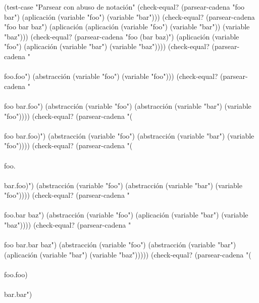 \documentclass[10pt,oneside,openany,letterpaper]{book}
\begin{document}
\nwenddocs{}\plusendmoddef
(test-case "Parsear con abuso de notación"
  (check-equal? (parsear-cadena "foo bar")
                (aplicación (variable "foo") (variable "bar")))
  (check-equal? (parsear-cadena "foo bar baz")
                (aplicación (aplicación (variable "foo") (variable "bar"))
                            (variable "baz")))
  (check-equal? (parsear-cadena "foo (bar baz)")
                (aplicación (variable "foo")
                            (aplicación (variable "bar") (variable "baz"))))
  (check-equal? (parsear-cadena "\\\\foo.foo")
                (abstracción (variable "foo") (variable "foo")))
  (check-equal? (parsear-cadena "\\\\foo bar.foo")
                (abstracción (variable "foo")
                             (abstracción (variable "bar") (variable "foo"))))
  (check-equal? (parsear-cadena "(\\\\foo bar.foo)")
                (abstracción (variable "foo")
                             (abstracción (variable "bar") (variable "foo"))))
  (check-equal? (parsear-cadena "(\\\\foo.\\\\bar.foo)")
                (abstracción (variable "foo")
                             (abstracción (variable "bar")
                                          (variable "foo"))))
  (check-equal? (parsear-cadena "\\\\foo.bar baz")
                (abstracción (variable "foo")
                             (aplicación (variable "bar")
                                         (variable "baz"))))
  (check-equal? (parsear-cadena "\\\\foo bar.bar baz")
                (abstracción (variable "foo")
                             (abstracción (variable "bar")
                                          (aplicación (variable "bar")
                                                      (variable "baz")))))
  (check-equal? (parsear-cadena "(\\\\foo.foo)\\\\bar.bar")
\end{document}
